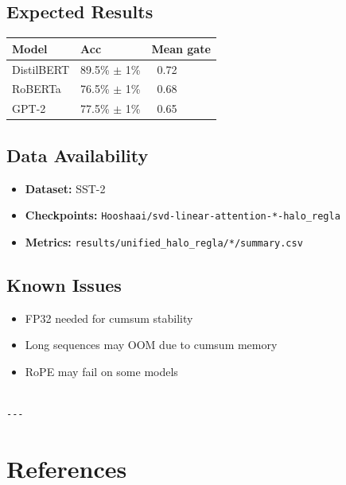 \subsection{Expected Results}

\begin{table}[H]
\centering
\small
\begin{tabular}{lll}
\toprule
\textbf{Model} & \textbf{Acc} & \textbf{Mean gate} \\
\midrule
DistilBERT & 89.5\% $\pm$ 1\% & ~0.72 \\
RoBERTa & 76.5\% $\pm$ 1\% & ~0.68 \\
GPT-2 & 77.5\% $\pm$ 1\% & ~0.65 \\
\bottomrule
\end{tabular}
\end{table}

\subsection{Data Availability}

\begin{itemize}
\item \textbf{Dataset:} SST-2
\item \textbf{Checkpoints:} \texttt{Hooshaai/svd-linear-attention-*-halo\_regla}
\item \textbf{Metrics:} \texttt{results/unified\_halo\_regla/*/summary.csv}

\end{itemize}
\subsection{Known Issues}

\begin{itemize}
\item FP32 needed for cumsum stability
\item Long sequences may OOM due to cumsum memory
\item RoPE may fail on some models
\end{itemize}
\begin{lstlisting}

---
\end{lstlisting}


\section{References}

